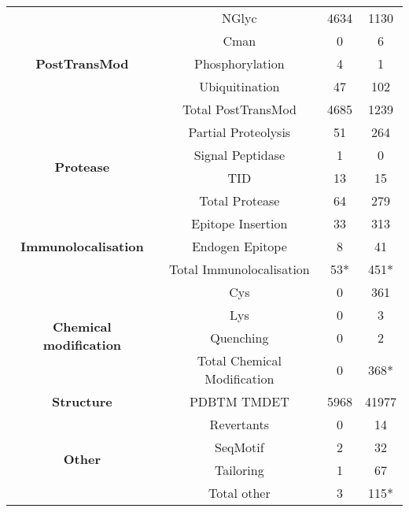 \begin{table}[htbp]
{\begin{tabular}{cccc}
    \midrule
    \multicolumn{1}{c}{\multirow{5}[10]{*}{\textbf{PostTransMod}}} & NGlyc & 4634  & \multicolumn{1}{c}{1130} \\
\cmidrule{2-4}          & Cman  & 0     & \multicolumn{1}{c}{6} \\
\cmidrule{2-4}          & Phosphorylation & 4     & \multicolumn{1}{c}{1} \\
\cmidrule{2-4}          & Ubiquitination & 47    & \multicolumn{1}{c}{102} \\
\cmidrule{2-4}          & Total PostTransMod & 4685  & \multicolumn{1}{c}{1239} \\
    \midrule
    \multicolumn{1}{c}{\multirow{4}[8]{*}{\textbf{Protease}}} & Partial Proteolysis & 51    & \multicolumn{1}{c}{264} \\
\cmidrule{2-4}          & Signal Peptidase & 1     & \multicolumn{1}{c}{0} \\
\cmidrule{2-4}          & TID   & 13    & \multicolumn{1}{c}{15} \\
\cmidrule{2-4}          & Total Protease & 64    & \multicolumn{1}{c}{279} \\
    \midrule
    \multicolumn{1}{c}{\multirow{3}[6]{*}{\textbf{Immunolocalisation}}} & Epitope Insertion & 33    & \multicolumn{1}{c}{313} \\
\cmidrule{2-4}          & Endogen Epitope & 8     & \multicolumn{1}{c}{41} \\
\cmidrule{2-4}          & Total Immunolocalisation & \multicolumn{1}{c}{53*} & 451* \\
    \midrule
    \multicolumn{1}{c}{\multirow{4}[8]{*}{\textbf{Chemical modification}}} & Cys   & 0     & \multicolumn{1}{c}{361} \\
\cmidrule{2-4}          & Lys   & 0     & \multicolumn{1}{c}{3} \\
\cmidrule{2-4}          & Quenching & 0     & \multicolumn{1}{c}{2} \\
\cmidrule{2-4}          & Total Chemical Modification & 0     & 368* \\
    \midrule
    \multicolumn{1}{c}{\textbf{Structure}} & PDBTM TMDET & 5968  & \multicolumn{1}{c}{41977} \\
    \midrule
    \multicolumn{1}{c}{\multirow{4}[8]{*}{\textbf{Other}}} & Revertants & 0     & \multicolumn{1}{c}{14} \\
\cmidrule{2-4}          & SeqMotif & 2     & \multicolumn{1}{c}{32} \\
\cmidrule{2-4}          & Tailoring & 1     & \multicolumn{1}{c}{67} \\
\cmidrule{2-4}          & Total other & 3     & 115* \\
    \bottomrule
    \end{tabular}%
    }
   \label{table:topdbevidence}
\end{table}%

